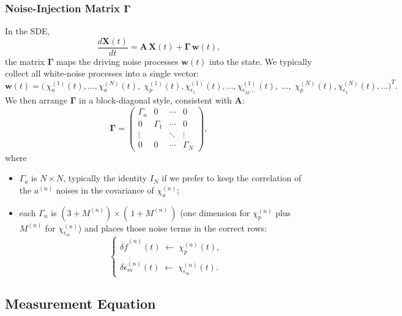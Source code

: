 \documentclass[]{scrartcl}
\begin{document}
\subsubsection*{Noise-Injection Matrix \(\mathbf{\Gamma}\)}

In the SDE,
\[
\frac{d\mathbf{X}(t)}{dt}
=
\mathbf{A}\,\mathbf{X}(t)
+ \mathbf{\Gamma}\,\mathbf{w}(t),
\]
the matrix $\mathbf{\Gamma}$ maps the driving noise processes $\mathbf{w}(t)$ into the state.  We typically collect all white-noise processes into a single vector:
\[
\mathbf{w}(t)
=
\bigl(\,\chi_{a}^{(1)}(t),\ldots,\chi_{a}^{(N)}(t),\;
\chi_{p}^{(1)}(t),\chi_{\epsilon_{1}}^{(1)}(t),\ldots,\chi_{\epsilon_{M^{(1)}}}^{(1)}(t),\;
\ldots,\;
\chi_{p}^{(N)}(t),\chi_{\epsilon_{1}}^{(N)}(t),\ldots\bigr)^{T}.
\]
We then arrange $\mathbf{\Gamma}$ in a block-diagonal style, consistent with $\mathbf{A}$:
\[
\mathbf{\Gamma}
=
\begin{pmatrix}
\Gamma_{\!a} & 0 & \cdots & 0\\
0 & \Gamma_{1} & \cdots & 0\\
\vdots & & \ddots & \vdots\\
0 & 0 & \cdots & \Gamma_{N}
\end{pmatrix},
\]
where
\begin{itemize}
\item $\Gamma_{\!a}$ is $N\times N$, typically the identity $I_N$ if we prefer to keep the correlation of the $a^{(n)}$ noises in the covariance of $\chi_{a}^{(n)}$;
\item each $\Gamma_{n}$ is $(3 + M^{(n)})\times(\,1 + M^{(n)}\,)$ (one dimension for $\chi_{p}^{(n)}$ plus $M^{(n)}$ for $\chi_{\epsilon_{m}}^{(n)}$) and places those noise terms in the correct rows:
\[
\begin{cases}
\dot{\delta f}^{(n)}(t)
\;\leftarrow\;
\chi_{p}^{(n)}(t),
\\
\dot{\delta\epsilon_{m}^{(n)}}(t)
\;\leftarrow\;
\chi_{\epsilon_m}^{(n)}(t).
\end{cases}
\]
\end{itemize}

\subsection{Measurement Equation}
\end{document}
